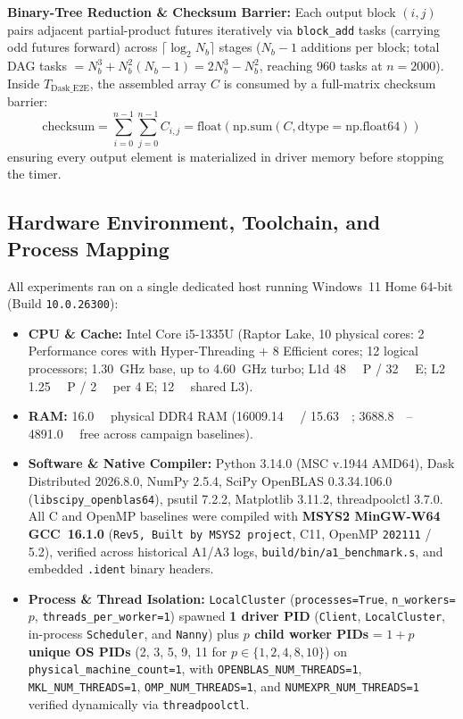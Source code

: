 \documentclass[11pt,a4paper]{article}
\begin{document}
\noindent\textbf{Binary-Tree Reduction \& Checksum Barrier:} Each output block $(i, j)$ pairs adjacent partial-product futures iteratively via \texttt{block\_add} tasks (carrying odd futures forward) across $\lceil \log_2 N_b \rceil$ stages ($N_b - 1$ additions per block; total DAG tasks $= N_b^3 + N_b^2(N_b - 1) = 2N_b^3 - N_b^2$, reaching $960$ tasks at $n=2000$). Inside $T_{\text{Dask\_E2E}}$, the assembled array $C$ is consumed by a full-matrix checksum barrier:
\begin{equation}
\text{checksum} = \sum_{i=0}^{n-1} \sum_{j=0}^{n-1} C_{i, j} = \text{float}(\text{np.sum}(C, \text{dtype}=\text{np.float64}))
\end{equation}
ensuring every output element is materialized in driver memory before stopping the timer.

\subsection{Hardware Environment, Toolchain, and Process Mapping}
All experiments ran on a single dedicated host running Windows~11 Home 64-bit (Build \texttt{10.0.26300}):
\begin{itemize}
    \item \textbf{CPU \& Cache:} Intel Core i5-1335U (Raptor Lake, 10 physical cores: 2 Performance cores with Hyper-Threading + 8 Efficient cores; 12 logical processors; \SI{1.30}{\giga\hertz} base, up to \SI{4.60}{\giga\hertz} turbo; L1d \SI{48}{\kilo\byte} P / \SI{32}{\kilo\byte} E; L2 \SI{1.25}{\mega\byte} P / \SI{2}{\mega\byte} per 4 E; \SI{12}{\mega\byte} shared L3).
    \item \textbf{RAM:} \SI{16.0}{\giga\byte} physical DDR4 RAM (\SI{16009.14}{\mebi\byte} / \SI{15.63}{\gibi\byte}; \SIrange{3688.8}{4891.0}{\mebi\byte} free across campaign baselines).
    \item \textbf{Software \& Native Compiler:} Python 3.14.0 (MSC v.1944 AMD64), Dask Distributed 2026.8.0, NumPy 2.5.4, SciPy OpenBLAS 0.3.34.106.0 (\texttt{libscipy\_openblas64}), psutil 7.2.2, Matplotlib 3.11.2, threadpoolctl 3.7.0. All C and OpenMP baselines were compiled with \textbf{MSYS2 MinGW-W64 GCC~16.1.0} (\texttt{Rev5, Built by MSYS2 project}, C11, OpenMP \texttt{202111} / 5.2), verified across historical A1/A3 logs, \nolinkurl{build/bin/a1_benchmark.s}, and embedded \texttt{.ident} binary headers.
    \item \textbf{Process \& Thread Isolation:} \texttt{LocalCluster} (\nolinkurl{processes=True}, \texttt{n\_workers=}$p$, \nolinkurl{threads_per_worker=1}) spawned \textbf{1 driver PID} (\texttt{Client}, \texttt{LocalCluster}, in-process \texttt{Scheduler}, and \texttt{Nanny}) plus \textbf{$p$ child worker PIDs} = \textbf{$1+p$ unique OS PIDs} (2, 3, 5, 9, 11 for $p \in \{1, 2, 4, 8, 10\}$) on \nolinkurl{physical_machine_count=1}, with \nolinkurl{OPENBLAS_NUM_THREADS=1}, \nolinkurl{MKL_NUM_THREADS=1}, \nolinkurl{OMP_NUM_THREADS=1}, and \nolinkurl{NUMEXPR_NUM_THREADS=1} verified dynamically via \texttt{threadpoolctl}.
\end{itemize}
\end{document}
